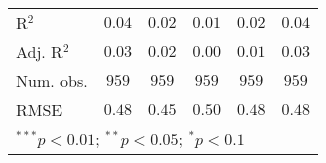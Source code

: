\begin{table}
\begin{center}
\begin{tabular}{l c c c c c}
\midrule
R$^2$         & $0.04$       & $0.02$      & $0.01$      & $0.02$      & $0.04$       \\
Adj. R$^2$    & $0.03$       & $0.02$      & $0.00$      & $0.01$      & $0.03$       \\
Num. obs.     & $959$        & $959$       & $959$       & $959$       & $959$        \\
RMSE          & $0.48$       & $0.45$      & $0.50$      & $0.48$      & $0.48$       \\
\bottomrule
\multicolumn{6}{l}{\scriptsize{$^{***}p<0.01$; $^{**}p<0.05$; $^{*}p<0.1$}}
\end{tabular}
\label{tab_risk}
\end{center}
\end{table}
